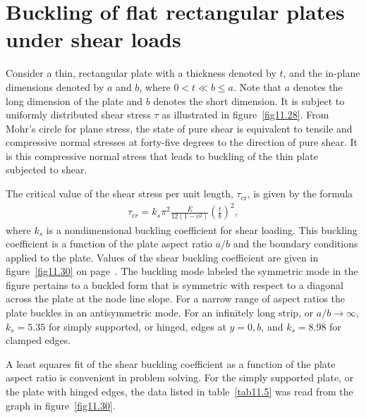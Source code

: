 \documentclass{AeroStructure-ERJohnson}
\begin{document}
\section{Buckling of flat rectangular plates under shear loads}\label{sec11.8}

Consider a thin, rectangular plate with a thickness denoted by $t$, and the in-plane dimensions denoted by $a$ and $b$, where $0<t \ll b \leq a$. Note that $a$ denotes the long dimension of the plate and $b$ denotes the short dimension. It is subject to uniformly distributed shear stress $\tau$ as illustrated in figure~\ref{fig11.28}. From Mohr's circle for plane stress, the state of pure shear is equivalent to tensile and compressive normal stresses at forty-five degrees to the direction of pure shear. It is this compressive normal stress that leads to buckling of the thin plate subjected to shear.

The critical value of the shear stress per unit length, $\tau_{\mathrm{cr}}$, is given by the formula
\begin{align}\label{eq11.116}
\tau_{c r}=k_{s} \pi^{2} \frac{E}{12\left(1-v^{2}\right)}\left(\frac{t}{b}\right)^{2},
\end{align}
where $k_{s}$ is a nondimensional buckling coefficient for shear loading. This buckling coefficient is a function of the plate aspect ratio $a/b$ and the boundary conditions applied to the plate. Values of the shear buckling coefficient are given in figure~\ref{fig11.30} on page~\pageref{fig11.30}. The buckling mode labeled the symmetric mode in the figure pertains to a buckled form that is symmetric with respect to a diagonal across the plate at the node line slope. For a narrow range of aspect ratios the plate buckles in an antisymmetric mode. For an infinitely long strip, or $a/b \rightarrow \infty$, $k_{s}=5.35$ for simply supported, or hinged, edges at $y=0, b$, and $k_{s}=8.98$ for clamped edges.

A least squares fit of the shear buckling coefficient as a function of the plate aspect ratio is convenient in problem solving. For the simply supported plate, or the plate with hinged edges, the data listed in table~\ref{tab11.5} was read from the graph in figure~\ref{fig11.30}.

\begin{table}[!h]
\end{table}
\end{document}
